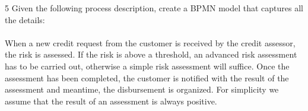 \begin{exercise}{5}
Given the following process description, create a BPMN model that captures all the details:
\\\\When a new credit request from the customer is received by the credit assessor, the risk is assessed. 
If the risk is above a threshold, an advanced risk assessment has to be carried out,
otherwise a simple risk assessment will suffice. 
Once the assessment has been completed, the customer is notified with the result of the assessment
and meantime, the disbursement is organized.
For simplicity we assume that the result of an assessment is always positive.
\end{exercise}

